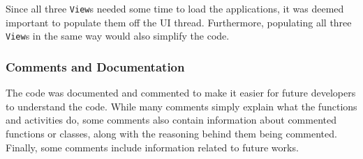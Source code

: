 Since all three \lstinline!View!s needed some time to load the applications, it was deemed important to populate them off the UI thread.
Furthermore, populating all three \lstinline!View!s in the same way would also simplify the code.

\subsubsection{Comments and Documentation}
The code was documented and commented to make it easier for future developers to understand the code.
While many comments simply explain what the functions and activities do, some comments also contain information about commented functions or classes, along with the reasoning behind them being commented.
Finally, some comments include information related to future works.

